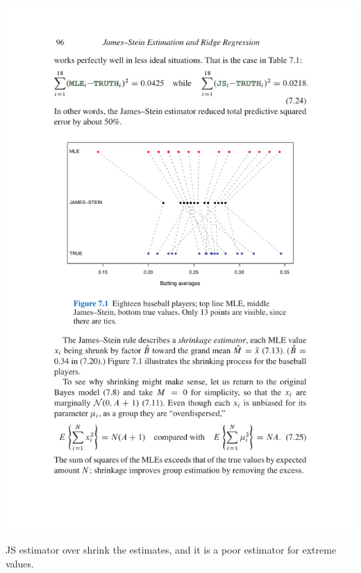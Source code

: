 \documentclass{beamer}
\begin{document}
\begin{frame}{}
	\centerline{\includegraphics[height=0.8\textheight]{figures/visual}}
	JS estimator over shrink the estimates,
	and it is a poor estimator for extreme values.
\end{frame}
\end{document}
